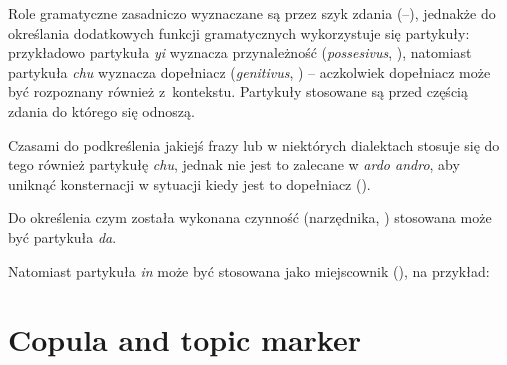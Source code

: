\glossex




Role gramatyczne zasadniczo wyznaczane są przez szyk zdania (\Nom{}--\Acc{}),
jednakże do określania dodatkowych funkcji gramatycznych wykorzystuje się
partykuły: przykładowo partykuła \emph{yi} wyznacza przynależność
(\emph{possesivus}, \Poss{}), natomiast partykuła \emph{chu} wyznacza
dopełniacz (\emph{genitivus}, \Gen{}) -- aczkolwiek dopełniacz może być
rozpoznany również z~kontekstu. Partykuły stosowane są przed częścią zdania do
którego się odnoszą.



Czasami do podkreślenia jakiejś frazy lub w niektórych dialektach stosuje się do
tego również partykułę \emph{chu}, jednak nie jest to zalecane w \emph{ardo
    andro}, aby uniknąć konsternacji w sytuacji kiedy jest to dopełniacz
(\Gen{}).






Do określenia czym została wykonana czynność (narzędnika, \Ins{})
stosowana może być partykuła \emph{da}.


Natomiast partykuła \emph{in} może być stosowana jako miejscownik
(\Loc{}), na przykład:




\section{Copula and topic marker}
\label{sec:copula}


